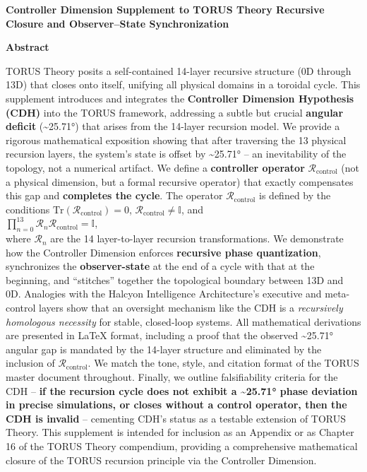 \documentclass[]{article}
\date{}
\begin{document}
\textbf{Controller Dimension Supplement to TORUS Theory Recursive
Closure and Observer--State Synchronization}

\textbf{Abstract}

TORUS Theory posits a self-contained 14-layer recursive structure (0D
through 13D) that closes onto itself​, unifying all physical domains in
a toroidal cycle. This supplement introduces and integrates the
\textbf{Controller Dimension Hypothesis (CDH)} into the TORUS framework,
addressing a subtle but crucial \textbf{angular deficit}
(\textasciitilde{}25.71°) that arises from the 14-layer recursion model.
We provide a rigorous mathematical exposition showing that after
traversing the 13 physical recursion layers, the system's state is
offset by \textasciitilde{}25.71° -- an inevitability of the topology,
not a numerical artifact. We define a \textbf{controller operator}
$\mathcal{R}_{\text{control}}$ (not a physical dimension, but a formal recursive operator) that exactly
compensates this gap and \textbf{completes the cycle}. The operator
$\mathcal{R}_{\text{control}}$
is defined by the conditions
$\mathrm{Tr}(\mathcal{R}_{\text{control}})=0$,
$\mathcal{R}_{\text{control}} \neq \mathbb{I}$, and\\
$\prod_{n=0}^{13} \mathcal{R}_n \mathcal{R}_{\text{control}} = \mathbb{I}$,\\
where $\mathcal{R}_n$ are the 14 layer-to-layer
recursion transformations. We demonstrate how the Controller Dimension
enforces \textbf{recursive phase quantization}, synchronizes the
\textbf{observer-state} at the end of a cycle with that at the
beginning, and ``stitches'' together the topological boundary between
13D and 0D. Analogies with the Halcyon Intelligence Architecture's
executive and meta-control layers show that an oversight mechanism like
the CDH is a \emph{recursively homologous necessity} for stable,
closed-loop systems​. All mathematical derivations are presented in
LaTeX format, including a proof that the observed
\textasciitilde{}25.71° angular gap is mandated by the 14-layer
structure and eliminated by the inclusion of
$\mathcal{R}_{\text{control}}$.
We match the tone, style, and citation format of the TORUS master
document throughout. Finally, we outline falsifiability criteria for the
CDH -- \textbf{if the recursion cycle does not exhibit a
\textasciitilde{}25.71° phase deviation in precise simulations, or
closes without a control operator, then the CDH is invalid} -- cementing
CDH's status as a testable extension of TORUS Theory. This supplement is
intended for inclusion as an Appendix or as Chapter 16 of the TORUS
Theory compendium, providing a comprehensive mathematical closure of the
TORUS recursion principle via the Controller Dimension.
\end{document}
